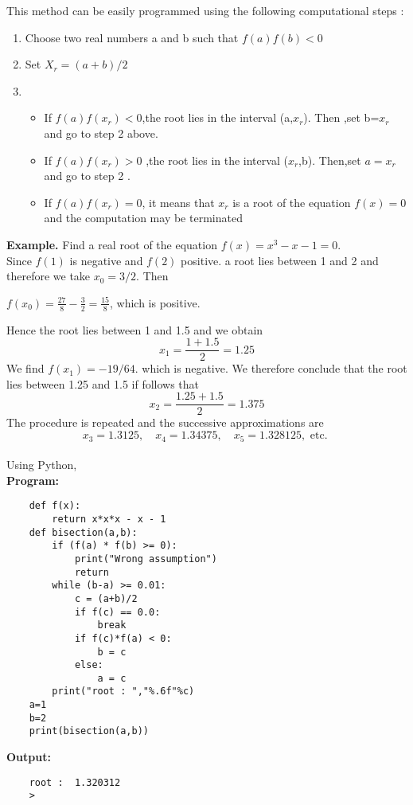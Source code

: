 \documentclass[12pt,a4paper,oneside]{book}
\begin{document}
\noindent This method can be easily programmed using the following computational steps :
\begin{enumerate}
	\item Choose two real numbers a and b such that $f(a)f(b)<0$\\
	\item Set $X_r=(a+b)/2$ \\
	\item 
	\begin{itemize}
		\item If $f(a)f(x_r)<0$,the root lies in the interval (a,$x_r$). Then ,set b=$x_r$ and go to step 2 above.\\
		\item If $f(a)f(x_r)>0$ ,the root lies in the interval ($x_r$,b). Then,set $a=x_r$ and go to step 2 .\\ 
		\item If $f(a)f(x_r)=0$, it means that $x_r$ is a root of the equation $f(x)=0$ and the computation may be terminated
	\end{itemize}
\end{enumerate}
\textbf{Example.} Find a real root of the equation $f(x)=x^3-x-1=0$.\\
Since $f(1)$ is negative and $f(2)$ positive. a root lies between 1 and 2 and therefore we take $x_0=3 / 2$. Then\\ \begin{center}
	$f\left(x_0\right)=\frac{27}{8}-\frac{3}{2}=\frac{15}{8}$, which is positive.\end{center}   
Hence the root lies between 1 and 1.5 and we obtain $$ x_1=\frac{1+1.5}{2}=1.25 $$ We find $f\left(x_1\right)=-19/64$. which is negative. We therefore conclude that the root lies between 1.25 and 1.5 if follows that $$ x_2=\frac{1.25+1.5}{2}=1.375 $$ The procedure is repeated and the successive approximations are $$ x_3=1.3125 , \quad x_4=1.34375, \quad x_5=1.328125, \text { etc. } $$\\
Using Python,\\
\textbf{Program:}\\
\begin{lstlisting}
	def f(x):
		return x*x*x - x - 1
	def bisection(a,b):
		if (f(a) * f(b) >= 0):
			print("Wrong assumption")
			return
		while (b-a) >= 0.01:
			c = (a+b)/2
			if f(c) == 0.0:
				break
			if f(c)*f(a) < 0:
				b = c
			else:
				a = c
		print("root : ","%.6f"%c)
	a=1
	b=2
	print(bisection(a,b))
\end{lstlisting}
\textbf{Output:}
\begin{verbatim}
	root :  1.320312
	>
\end{verbatim}
\end{document}
